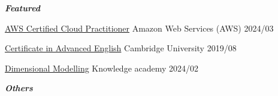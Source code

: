 
\textbf{\textit{Featured}}

\begin{cvcerts}

	\cvcert
	{\href{https://www.credly.com/badges/f19ebd37-79be-4d9e-807b-bb4a19b63187/public_url}{AWS Certified Cloud Practitioner}} %
	{Amazon Web Services (AWS)} %
	{} %
	{2024/03} %
		
	\cvcert
	{\href{https://1drv.ms/b/s!AkPthURenJLHi8Vx6tme1nLdTLFksw?e=fgHyIm}{Certificate in Advanced English}} %
	{Cambridge University} %
	{} %
	{2019/08} %
	
	\cvcert
	{\href{https://1drv.ms/b/s!AkPthURenJLHi-Jxv8a9HKcKT5R4ig?e=rkuuRE}{Dimensional Modelling}} %
	{Knowledge academy} %
	{} %
	{2024/02} %


\end{cvcerts}

\vspace*{2mm}

\textbf{\textit{Others}}

